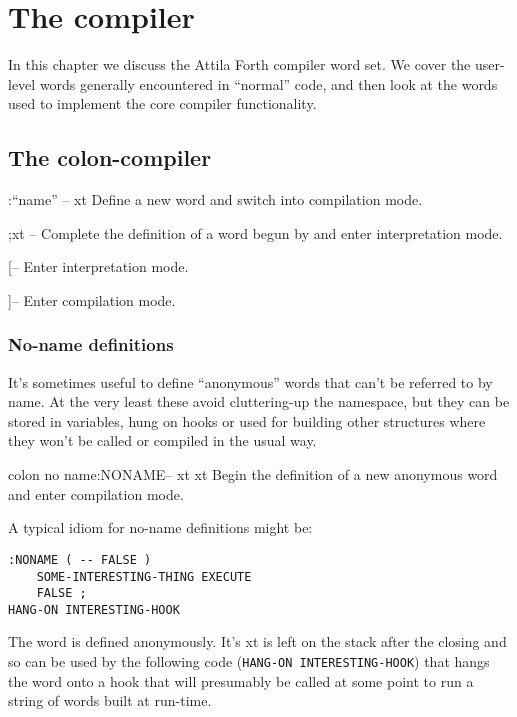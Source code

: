 \chapter{The compiler}
\label{chap:compiler}

\begin{precis}
  In this chapter we discuss the Attila Forth compiler word set. We
  cover the user-level words generally encountered in ``normal'' code,
  and then look at the words used to implement the core compiler
  functionality.
\end{precis}


\section{The colon-compiler}
\label{sec:colon-compiler}


\begin{defword}[colon]{:}{``name'' -- xt}
  Define a new word  and switch into compilation mode.
\end{defword}

\begin{defword}[semi]{;}{xt --}
  Complete the definition of a word begun by \word{:} and enter
  interpretation mode.
\end{defword}

\begin{defword}{[}{--}
  Enter interpretation mode.
\end{defword}

\begin{defword}{]}{--}
  Enter compilation mode.
\end{defword}

\subsection{No-name definitions}
\label{sec:colon-noname}

It's sometimes useful to define ``anonymous'' words that can't be
referred to by name. At the very least these avoid cluttering-up the
namespace, but they can be stored in variables, hung on hooks or used
for building other structures where they won't be called or compiled
in the usual way.

\begin{defword}{colon no name}{:NONAME}{-- xt xt}
  Begin the definition of a new anonymous word and enter compilation
  mode.
\end{defword}

A typical idiom for no-name definitions might be:

\begin{verbatim}
:NONAME ( -- FALSE )
    SOME-INTERESTING-THING EXECUTE
    FALSE ;
HANG-ON INTERESTING-HOOK
\end{verbatim}

\noindent The word is defined anonymously. It's xt is left on the
stack after the closing \word{;} and so can be used by the following
code (\texttt{HANG-ON INTERESTING-HOOK}) that hangs the word onto a
hook that will presumably be called at some point to run a string of
words built at run-time.

